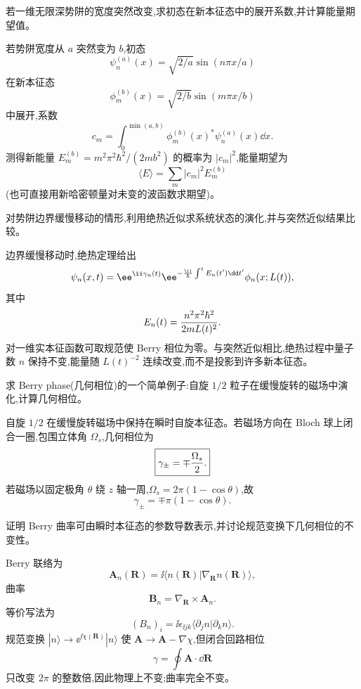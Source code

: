 \begin{question}
若一维无限深势阱的宽度突然改变,求初态在新本征态中的展开系数,并计算能量期望值。
\end{question}
\begin{solution}
若势阱宽度从 $a$ 突然变为 $b$,初态
\[
\psi_n^{(a)}(x)=\sqrt{2/a}\sin(n\pi x/a)
\]
在新本征态
\[
\phi_m^{(b)}(x)=\sqrt{2/b}\sin(m\pi x/b)
\]
中展开,系数
\[
c_m=\int_0^{\min(a,b)}\phi_m^{(b)}(x)^*\psi_n^{(a)}(x)\dd x.
\]
测得新能量 $E_m^{(b)}=m^2\pi^2\hbar^2/(2mb^2)$ 的概率为 $|c_m|^2$,能量期望为
\[
\langle E\rangle=\sum_m |c_m|^2E_m^{(b)}
\]
(也可直接用新哈密顿量对未变的波函数求期望)。
\end{solution}

\begin{question}
对势阱边界缓慢移动的情形,利用绝热近似求系统状态的演化,并与突然近似结果比较。
\end{question}
\begin{solution}
边界缓慢移动时,绝热定理给出
\[
\psi_n(x,t)=\ee^{\ii\gamma_n(t)}\ee^{-{\ii\over\hbar}\int^t E_n(t')\dd t'}\phi_n(x;L(t)),
\]
其中
\[
E_n(t)={n^2\pi^2\hbar^2\over2mL(t)^2}.
\]
对一维实本征函数可取规范使 Berry 相位为零。与突然近似相比,绝热过程中量子数 $n$ 保持不变,能量随 $L(t)^{-2}$ 连续改变,而不是投影到许多新本征态。
\end{solution}

\begin{question}
求 Berry phase(几何相位)的一个简单例子:自旋 $1/2$ 粒子在缓慢旋转的磁场中演化,计算几何相位。
\end{question}
\begin{solution}
自旋 $1/2$ 在缓慢旋转磁场中保持在瞬时自旋本征态。若磁场方向在 Bloch 球上闭合一圈,包围立体角 $\Omega_s$,几何相位为
\[
\boxed{\gamma_\pm=\mp{\Omega_s\over2}.}
\]
若磁场以固定极角 $\theta$ 绕 $z$ 轴一周,$\Omega_s=2\pi(1-
\cos\theta)$,故
\[
\gamma_\pm=\mp\pi(1-
\cos\theta).
\]
\end{solution}

\begin{question}
证明 Berry 曲率可由瞬时本征态的参数导数表示,并讨论规范变换下几何相位的不变性。
\end{question}
\begin{solution}
Berry 联络为
\[
\mathbf A_n(\mathbf R)=\ii\langle n(\mathbf R)|\nabla_\mathbf R n(\mathbf R)\rangle,
\]
曲率
\[
\mathbf B_n=\nabla_\mathbf R\times\mathbf A_n.
\]
等价写法为
\[
(B_n)_i=\ii\epsilon_{\ii jk}\langle\partial_j n|\partial_k n\rangle.
\]
规范变换 $|n\rangle\to \ee^{\ii\chi(\mathbf R)}|n\rangle$ 使 $\mathbf A\to\mathbf A-\nabla\chi$,但闭合回路相位
\[
\gamma=\oint\mathbf A\cdot\dd\mathbf R
\]
只改变 $2\pi$ 的整数倍,因此物理上不变;曲率完全不变。
\end{solution}

